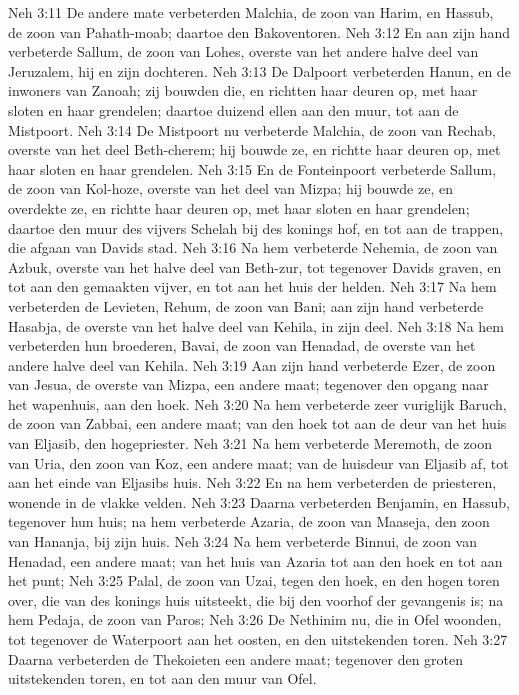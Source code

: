Neh 3:11  De andere mate verbeterden Malchia, de zoon van Harim, en Hassub, de zoon van Pahath-moab; daartoe den Bakoventoren.
Neh 3:12  En aan zijn hand verbeterde Sallum, de zoon van Lohes, overste van het andere halve deel van Jeruzalem, hij en zijn dochteren.
Neh 3:13  De Dalpoort verbeterden Hanun, en de inwoners van Zanoah; zij bouwden die, en richtten haar deuren op, met haar sloten en haar grendelen; daartoe duizend ellen aan den muur, tot aan de Mistpoort.
Neh 3:14  De Mistpoort nu verbeterde Malchia, de zoon van Rechab, overste van het deel Beth-cherem; hij bouwde ze, en richtte haar deuren op, met haar sloten en haar grendelen.
Neh 3:15  En de Fonteinpoort verbeterde Sallum, de zoon van Kol-hoze, overste van het deel van Mizpa; hij bouwde ze, en overdekte ze, en richtte haar deuren op, met haar sloten en haar grendelen; daartoe den muur des vijvers Schelah bij des konings hof, en tot aan de trappen, die afgaan van Davids stad.
Neh 3:16  Na hem verbeterde Nehemia, de zoon van Azbuk, overste van het halve deel van Beth-zur, tot tegenover Davids graven, en tot aan den gemaakten vijver, en tot aan het huis der helden.
Neh 3:17  Na hem verbeterden de Levieten, Rehum, de zoon van Bani; aan zijn hand verbeterde Hasabja, de overste van het halve deel van Kehila, in zijn deel.
Neh 3:18  Na hem verbeterden hun broederen, Bavai, de zoon van Henadad, de overste van het andere halve deel van Kehila.
Neh 3:19  Aan zijn hand verbeterde Ezer, de zoon van Jesua, de overste van Mizpa, een andere maat; tegenover den opgang naar het wapenhuis, aan den hoek.
Neh 3:20  Na hem verbeterde zeer vuriglijk Baruch, de zoon van Zabbai, een andere maat; van den hoek tot aan de deur van het huis van Eljasib, den hogepriester.
Neh 3:21  Na hem verbeterde Meremoth, de zoon van Uria, den zoon van Koz, een andere maat; van de huisdeur van Eljasib af, tot aan het einde van Eljasibs huis.
Neh 3:22  En na hem verbeterden de priesteren, wonende in de vlakke velden.
Neh 3:23  Daarna verbeterden Benjamin, en Hassub, tegenover hun huis; na hem verbeterde Azaria, de zoon van Maaseja, den zoon van Hananja, bij zijn huis.
Neh 3:24  Na hem verbeterde Binnui, de zoon van Henadad, een andere maat; van het huis van Azaria tot aan den hoek en tot aan het punt;
Neh 3:25  Palal, de zoon van Uzai, tegen den hoek, en den hogen toren over, die van des konings huis uitsteekt, die bij den voorhof der gevangenis is; na hem Pedaja, de zoon van Paros;
Neh 3:26  De Nethinim nu, die in Ofel woonden, tot tegenover de Waterpoort aan het oosten, en den uitstekenden toren.
Neh 3:27  Daarna verbeterden de Thekoieten een andere maat; tegenover den groten uitstekenden toren, en tot aan den muur van Ofel.
